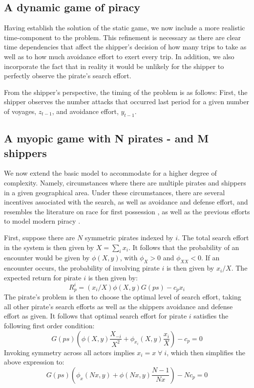 \documentclass[11pt, oneside]{article}   	%
\begin{document}
\subsection{A dynamic game of piracy}

Having establish the solution of the static game, we now include a more realistic time-component to the problem. This refinement is necessary as there are clear time dependencies that affect the shipper's decision of how many trips to take as well as to how much avoidance effort to exert every trip. In addition, we also incorporate the fact that in reality it would be unlikely for the shipper to perfectly observe the pirate's search effort. 

From the shipper's perspective, the timing of the problem is as follows: First, the shipper observes the number attacks that occurred last period for a given number of voyages, $z_{t-1}$, and avoidance effort, $y_{t-1}$.


\subsection{A myopic game with N pirates -  and M shippers}
We now extend the basic model to accommodate for a higher degree of complexity. Namely, circumstances where there are multiple pirates and shippers in a given geographical area. Under these circumstances, there are several incentives associated with the search, as well as avoidance and defense effort, and resembles the literature on race for first possession \parencite{mortensen1982property,lueck1995rule}, as well as the previous efforts to model modern piracy \parencite{hallwood2013economic}.

First, suppose there are $N$ symmetric pirates indexed by $i$. The total search effort in the system is then given by $X=\sum_i x_i$. It follows that the probability of an encounter would be given by $\phi(X,y)$, with $\phi_X>0$ and $\phi_{XX}<0$. If an encounter occurs, the probability of involving pirate $i$ is then given by $x_i/X$. The expected return for pirate $i$ is then given by:
\begin{equation}
R^i_p=(x_i/X)\phi(X,y)G(ps)-c_px_i
\end{equation}
The pirate's problem is then to choose the optimal level of search effort, taking all other pirate's search efforts as well as the shippers avoidance and defense effort as given. It follows that optimal search effort for pirate $i$ satisfies the following first order condition:
\begin{equation}
G(ps)\left(\phi(X,y)\frac{X_{-i}}{X^2}+\phi_{x_i}(X,y)\frac{x_i}{X}\right)-c_p=0
\end{equation}
Invoking symmetry across all actors implies $x_i=x\;\forall\; i$, which then simplifies the above expression to:
\begin{equation}
G(ps)\left(\phi_{x}(Nx,y)+\phi(Nx,y)\frac{N-1}{Nx}\right)-Nc_p=0
\end{equation}
\end{document}
